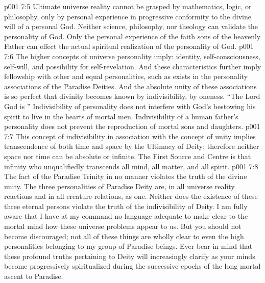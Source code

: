 \vs p001 7:5 Ultimate universe reality cannot be grasped by mathematics, logic, or philosophy, only by personal experience in progressive conformity to the divine will of a personal God. Neither science, philosophy, nor theology can validate the personality of God. Only the personal experience of the faith sons of the heavenly Father can effect the actual spiritual realization of the personality of God.
\vs p001 7:6 \pc The higher concepts of universe personality imply: identity, self\hyp{}consciousness, self\hyp{}will, and possibility for self\hyp{}revelation. And these characteristics further imply fellowship with other and equal personalities, such as exists in the personality associations of the Paradise Deities. And the absolute unity of these associations is so perfect that divinity becomes known by indivisibility, by oneness. “The Lord God is ” Indivisibility of personality does not interfere with God’s bestowing his spirit to live in the hearts of mortal men. Indivisibility of a human father’s personality does not prevent the reproduction of mortal sons and daughters.
\vs p001 7:7 This concept of indivisibility in association with the concept of unity implies transcendence of both time and space by the Ultimacy of Deity; therefore neither space nor time can be absolute or infinite. The First Source and Centre is that infinity who unqualifiedly transcends all mind, all matter, and all spirit.
\vs p001 7:8 The fact of the Paradise Trinity in no manner violates the truth of the divine unity. The three personalities of Paradise Deity are, in all universe reality reactions and in all creature relations, as one. Neither does the existence of these three eternal persons violate the truth of the indivisibility of Deity. I am fully aware that I have at my command no language adequate to make clear to the mortal mind how these universe problems appear to us. But you should not become discouraged; not all of these things are wholly clear to even the high personalities belonging to my group of Paradise beings. Ever bear in mind that these profound truths pertaining to Deity will increasingly clarify as your minds become progressively spiritualized during the successive epochs of the long mortal ascent to Paradise.
